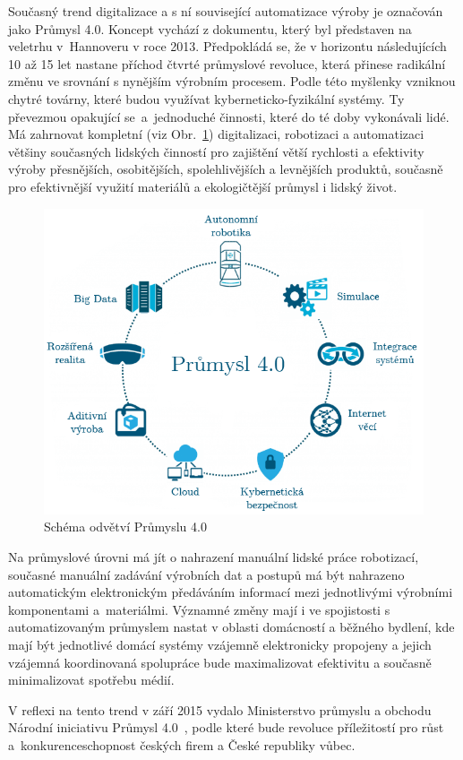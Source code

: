 Současný trend digitalizace a s ní související automatizace výroby je označován jako Průmysl 4.0. Koncept vychází z dokumentu, který byl představen na veletrhu v~Hannoveru v roce 2013. Předpokládá se, že v horizontu následujících 10 až 15 let nastane příchod čtvrté průmyslové revoluce, která přinese radikální změnu ve srovnání s nynějším výrobním procesem. Podle této myšlenky vzniknou chytré továrny, které budou využívat kyberneticko-fyzikální systémy. Ty převezmou opakující se~a~jednoduché činnosti, které do té doby vykonávali lidé. Má zahrnovat kompletní (viz Obr.~\ref{SchemaPrumysl4}) digitalizaci, robotizaci a automatizaci většiny současných lidských činností pro zajištění větší rychlosti a efektivity výroby přesnějších, osobitějších, spolehlivějších a levnějších produktů, současně pro efektivnější využití materiálů a ekologičtější průmysl i lidský život.

\vspace{-10pt}	
	\begin{figure}[!ht]
  \begin{center}
   \includegraphics[scale=0.4]{obrazky/iot_industry4}
  \end{center}
	\vspace{-20pt}	
  \caption{Schéma odvětví Průmyslu 4.0}
	\label{SchemaPrumysl4}
\vspace{-10pt}	
\end{figure}



Na průmyslové úrovni má jít o nahrazení manuální lidské práce robotizací, současné manuální zadávání výrobních dat a postupů má být nahrazeno automatickým elektronickým předáváním informací mezi jednotlivými výrobními komponentami a~materiálmi. Významné změny mají i ve spojistosti s automatizovaným průmyslem nastat v oblasti domácností a běžného bydlení, kde mají být jednotlivé domácí systémy vzájemně elektronicky propojeny a jejich vzájemná koordinovaná spolupráce bude maximalizovat efektivitu a současně minimalizovat spotřebu médií.

V reflexi na tento trend v září 2015 vydalo Ministerstvo průmyslu a obchodu Národní iniciativu Průmysl 4.0~\cite{uvod_prumysl_4_pdf}, podle které bude revoluce příležitostí pro růst a~konkurenceschopnost českých firem a České republiky vůbec.









